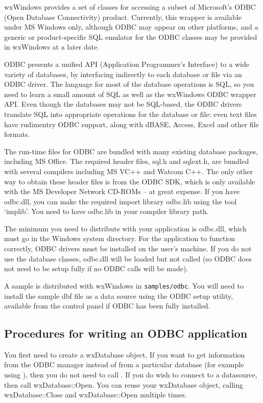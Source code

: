wxWindows provides a set of classes for accessing a subset of Microsoft's ODBC (Open Database Connectivity)
product. Currently, this wrapper is available under MS Windows only, although
ODBC may appear on other platforms, and a generic or product-specific SQL emulator for the ODBC
classes may be provided in wxWindows at a later date.

ODBC presents a unified API (Application Programmer's Interface) to a
wide variety of databases, by interfacing indirectly to each database or
file via an ODBC driver. The language for most of the database
operations is SQL, so you need to learn a small amount of SQL as well as
the wxWindows ODBC wrapper API. Even though the databases may not be
SQL-based, the ODBC drivers translate SQL into appropriate operations
for the database or file: even text files have rudimentry ODBC support,
along with dBASE, Access, Excel and other file formats.

The run-time files for ODBC are bundled with many existing database
packages, including MS Office. The required header files, sql.h and
sqlext.h, are bundled with several compilers including MS VC++ and
Watcom C++. The only other way to obtain these header files is from the
ODBC SDK, which is only available with the MS Developer Network CD-ROMs
-- at great expense. If you have odbc.dll, you can make the required
import library odbc.lib using the tool `implib'. You need to have odbc.lib
in your compiler library path.

The minimum you need to distribute with your application is odbc.dll, which must
go in the Windows system directory. For the application to function correctly,
ODBC drivers must be installed on the user's machine. If you do not use the database
classes, odbc.dll will be loaded but not called (so ODBC does not need to be
setup fully if no ODBC calls will be made).

A sample is distributed with wxWindows in {\tt samples/odbc}. You will need to install
the sample dbf file as a data source using the ODBC setup utility, available from
the control panel if ODBC has been fully installed.

\subsection{Procedures for writing an ODBC application}

You first need to create a wxDatabase object. If you want to get information
from the ODBC manager instead of from a particular database (for example
using ), then you
do not need to call .
If you do wish to connect to a datasource, then call wxDatabase::Open.
You can reuse your wxDatabase object, calling wxDatabase::Close and wxDatabase::Open
multiple times.

